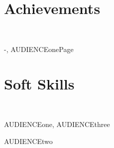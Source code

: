 	\section*{Achievements}
	
	\\
	
\begin{shownto}{-, AUDIENCEonePage}%
	\section*{Soft Skills}
		
		\\ \normalsize
	\begin{shownto}{AUDIENCEone, AUDIENCEthree}%
		
	\end{shownto}
	\begin{shownto}{AUDIENCEtwo}%
		
	\end{shownto}
\end{shownto}
